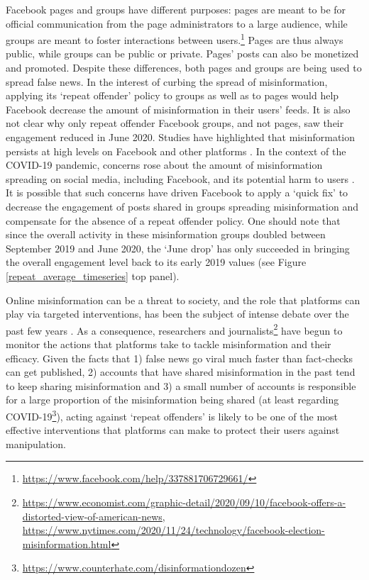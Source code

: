 \documentclass[11pt,a4paper]{article}
\begin{document}
Facebook pages and groups have different purposes: pages are meant to be for official communication from the page administrators to a large audience, while groups are meant to foster interactions between users.\footnote{\href{https://www.facebook.com/help/337881706729661/}{https://www.facebook.com/help/337881706729661/}} 
Pages are thus always public, while groups can be public or private.
Pages' posts can also be monetized and promoted.
Despite these differences, both pages and groups are being used to spread false news. 
In the interest of curbing the spread of misinformation, applying its `repeat offender' policy to groups as well as to pages would help Facebook decrease the amount of misinformation in their users’ feeds. 
It is also not clear why only repeat offender Facebook groups, and not pages, saw their engagement reduced in June 2020.
Studies have highlighted that misinformation persists at high levels on Facebook and other platforms \citep{kornbluh2020new, resnick2018iffy}.
In the context of the COVID-19 pandemic, concerns rose about the amount of misinformation spreading on social media, including Facebook, and its potential harm to users \citep{johnson2020online}.
It is possible that such concerns have driven Facebook to apply a `quick fix' to decrease the engagement of posts shared in groups spreading misinformation and compensate for the absence of a repeat offender policy.
One should note that since the overall activity in these misinformation groups doubled between September 2019 and June 2020, the `June drop' has only succeeded in bringing the overall engagement level back to its early 2019 values (see Figure \ref{repeat_average_timeseries} top panel).

Online misinformation can be a threat to society, and the role that platforms can play via targeted interventions, has been the subject of intense debate over the past few years \citep{rogers2020deplatforming, de2020internet}. 
As a consequence, researchers \citep{mena2020cleaning, yaqub2020effects} and journalists\footnote{\href{https://www.economist.com/graphic-detail/2020/09/10/facebook-offers-a-distorted-view-of-american-news}{https://www.economist.com/graphic-detail/2020/09/10/facebook-offers-a-distorted-view-of-american-news}, \href{https://www.nytimes.com/2020/11/24/technology/facebook-election-misinformation.html}{https://www.nytimes.com/2020/11/24/technology/facebook-election-misinformation.html}} have begun to monitor the actions that platforms take to tackle misinformation and their efficacy.
Given the facts that 1) false news go viral much faster than fact-checks can get published, 2) accounts that have shared misinformation in the past tend to keep sharing misinformation and 3) a small number of accounts is responsible for a large proportion of the misinformation being shared (at least regarding COVID-19\footnote{\href{https://www.counterhate.com/disinformationdozen}{https://www.counterhate.com/disinformationdozen}}), acting against `repeat offenders' is likely to be one of the most effective interventions that platforms can make to protect their users against manipulation.
\end{document}
